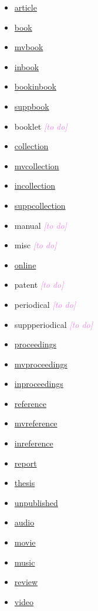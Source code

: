 \documentclass[extrafontsizes,11pt,a4paper,oneside]{memoir}
\newcommand*{\aside}[1]{\textcolor{violet}{\emph{[#1]}}}
\begin{document}
    \begin{multicols}{2}
        \begin{itemize}\firmlist
            \item\hyperref[sec:article]{article}
            \item\hyperref[sec:book]{book}
            \item\hyperref[sec:book]{mvbook}
            \item\hyperref[sec:inx]{inbook}
            \item\hyperref[sec:inx]{bookinbook}
            \item\hyperref[sec:inx]{suppbook}
            \item booklet \aside{to do}
            \item\hyperref[sec:book]{collection}
            \item\hyperref[sec:book]{mvcollection}
            \item\hyperref[sec:inx]{incollection}
            \item\hyperref[sec:inx]{suppcollection}
            \item manual \aside{to do}
            \item misc \aside{to do}
            \item\hyperref[sec:electronic]{online}
            \item patent \aside{to do}
            \item periodical \aside{to do}
            \item suppperiodical \aside{to do}
            \item\hyperref[sec:proceedings]{proceedings}
            \item\hyperref[sec:proceedings]{mvproceedings}
            \item\hyperref[sec:inproceedings]{inproceedings}
            \item\hyperref[sec:book]{reference}
            \item\hyperref[sec:book]{mvreference}
            \item\hyperref[sec:inx]{inreference}
            \item\hyperref[sec:report]{report}
            \item\hyperref[sec:thesis]{thesis}
            \item\hyperref[sec:unpublished]{unpublished}
            \item\hyperref[sec:audiovideo]{audio}
            \item\hyperref[sec:audiovideo]{movie}
            \item\hyperref[sec:audiovideo]{music}
            \item\hyperref[sec:article]{review}
            \item\hyperref[sec:audiovideo]{video}
        \end{itemize}
    \end{multicols}
    
\end{document}
